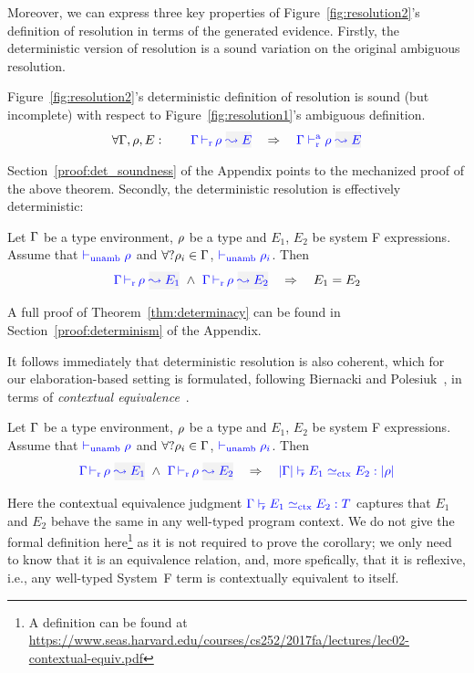 Moreover, we can express three key properties of Figure~\ref{fig:resolution2}'s
definition of resolution in terms of the generated evidence.
Firstly, the deterministic version of resolution is a sound variation on the original ambiguous resolution.
\begin{theorem}[Soundness]
Figure~\ref{fig:resolution2}'s deterministic definition of resolution is sound (but
incomplete) with respect to Figure~\ref{fig:resolution1}'s ambiguous definition.
\[\forall \tenv, \rulet, E: \quad\quad \dres{\tenv}{\rulet}{E} \quad\Rightarrow\quad \ares{\tenv}{\rulet}{E} \]
\end{theorem}
Section~\ref{proof:det_soundness} of the Appendix points to the mechanized proof of the above
theorem.
Secondly, the deterministic resolution is effectively deterministic:
\begin{theorem}[Determinacy]\label{thm:determinacy}
Let $\Gamma$ be a type environment, $\rho$ be a type and $E_1$, $E_2$ be system F expressions.
Assume that ${\color{blue}  \vdash_{\mathrm{unamb}} \rho}$ and $\forall ?\rho_i\in\Gamma$, ${\color{blue}  \vdash_{\mathrm{unamb}} \rho_i}$. Then
\[ %
     \dres{\tenv}{\rulet}{E_1} ~\wedge~ 
     \dres{\tenv}{\rulet}{E_2} \quad\Rightarrow\quad E_1 = E_2 \]
\end{theorem}
A full proof of Theorem~\ref{thm:determinacy} can be found in
Section~\ref{proof:determinism} of the Appendix.

It follows immediately that deterministic resolution is also coherent,
which for our elaboration-based setting is formulated, following Biernacki and Polesiuk~, in
terms of \emph{contextual equivalence}~\cite{morris}.
\begin{corollary}[Coherence]
Let $\Gamma$ be a type environment, $\rho$ be a type and $E_1$, $E_2$ be system F expressions.
Assume that ${\color{blue}  \vdash_{\mathrm{unamb}} \rho}$ and $\forall ?\rho_i\in\Gamma$, ${\color{blue}  \vdash_{\mathrm{unamb}} \rho_i}$. Then
\[ %
     \dres{\tenv}{\rulet}{E_1} ~\wedge~ 
     \dres{\tenv}{\rulet}{E_2} \quad\Rightarrow\quad 
     \fctx{\etrans{\tenv}}{E_1}{E_2}{\ttrans[\rulet]} \]
\end{corollary}
Here the contextual equivalence judgment ${\color{blue} \Gamma \vdash_{\scriptscriptstyle \hspace{-1mm}\mathtt{F}} E_1 \simeq_{\rm ctx} E_2 : T}$ captures
that $E_1$ and $E_2$ behave the same in any well-typed program context. We do
not give the formal definition here\footnote{A definition can be found at \url{https://www.seas.harvard.edu/courses/cs252/2017fa/lectures/lec02-contextual-equiv.pdf}} as it is not required to prove the
corollary; we only need to know that it is an equivalence relation, and, more
spefically, that it is reflexive, i.e., any well-typed System~F term is
contextually equivalent to itself. 

